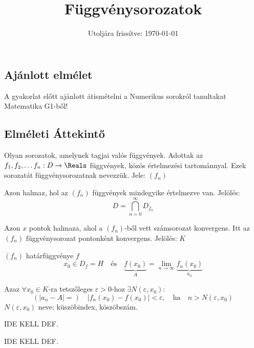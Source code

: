 \documentclass[a4paper, 12pt]{scrartcl}
\title{Függvénysorozatok}
\date{Utoljára frissítve: \today}
\begin{document}
\maketitle
\subsection*{Ajánlott elmélet}
A gyakorlat előtt ajánlott átismételni a Numerikus sorokról tanultakat Matematika G1-ből!
\subsection{Elméleti Áttekintő}
\begin{definition}[Függvénysorozat]
    Olyan sorozatok, amelynek tagjai valós függvények. Adottak az $f_1, f_2, \dots f_n : D \rightarrow \Reals $ függvények, közös értelmezési tartománnyal. Ezek sorozatát függvénysorozatnak nevezzük. Jele: $(f_n)$
\end{definition}

\begin{definition}
    Azon halmaz, hol az $(f_n)$ függvények mindegyike értelmezve van. Jelölés:
    \[
    D = \bigcap_{n=0}^\infty D_{f_n}
    \]
\end{definition}

\begin{definition}
    Azon $x$ pontok halmaza, ahol a $(f_n)$-ből vett számsorozat konvergens. Itt az $(f_n)$ függvénysorozat pontonként konvergens. Jelölés: $K$
\end{definition}

\begin{definition}
    $(f_n)$ határfüggvénye $f$
    \[
    x_0 \in D_f = H \quad \text{és} \quad \underbrace{f(x_0)}_{A} = \lim_{n \to \infty} \underbrace{f_n(x_0)}_{a_n}
    \]

    Azaz $\forall x_0 \in K$-ra tetszőleges $\varepsilon > 0$-hoz $\exists N(\varepsilon, x_0)$:
    \[
    (| a_n - A |=) \quad |f_n(x_0)-f(x_0)| < \varepsilon, \quad \text{ha} \quad n > N(\varepsilon, x_0)
    \]
    $N(\varepsilon, x_0)$ neve: küszöbindex, köszöbszám.
\end{definition}

\begin{definition}
    IDE KELL DEF.
\end{definition}

\begin{definition}
    IDE KELL DEF.
\end{definition}
\clearpage
\end{document}
